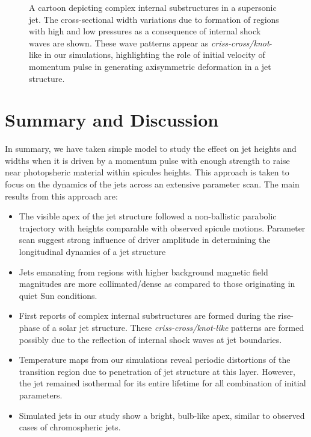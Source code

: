 \documentclass[12pt]{ociamthesis}
\begin{document}
\begin{figure}
\captionsetup[subfigure]{labelformat=empty}
\centering
{}
\caption{A cartoon depicting complex internal substructures in a supersonic jet. The cross-sectional width variations due to formation of regions with high and low pressures as a consequence of internal shock waves are shown. These wave patterns appear as \textit{criss-cross/knot}-like in our simulations, highlighting the role of initial velocity of momentum pulse in generating axisymmetric deformation in a jet structure. }
\label{cartoon_jet_waves}
\end{figure}
\section{Summary and Discussion}
\label{sec:c2discussion}
In summary, we have taken simple model to study the effect on jet heights and widths when it is driven by a momentum pulse with enough strength to raise near photopsheric material within spicules heights. This approach is taken to focus on the dynamics of the jets across an extensive parameter scan. The main results from this approach are:   
\begin{itemize}
\item{The visible apex of the jet structure followed a non-ballistic parabolic trajectory with heights comparable with observed spicule motions. Parameter scan suggest strong influence of driver amplitude in determining the longitudinal dynamics of a jet structure}

\item{Jets emanating from regions with higher background magnetic field magnitudes are more collimated/dense as compared to those originating in quiet Sun conditions.}

\item{First reports of complex internal substructures are formed during the rise-phase of a solar jet structure. These \textit{criss-cross/knot-like} patterns are formed possibly due to the reflection of internal shock waves at jet boundaries.}

\item{Temperature maps from our simulations reveal periodic distortions of the transition region due to penetration of jet structure at this layer. However, the jet remained isothermal for its entire lifetime for all combination of initial parameters.}

\item{Simulated jets in our study show a bright, bulb-like apex, similar to observed cases of chromospheric jets.}
\end{itemize}
\end{document}
